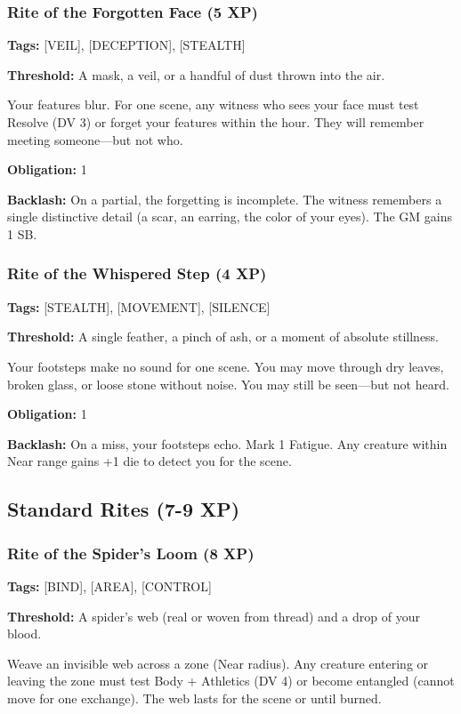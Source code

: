 \subsubsection{Rite of the Forgotten Face (5 XP)}

\textbf{Tags:} [VEIL], [DECEPTION], [STEALTH]

\textbf{Threshold:} A mask, a veil, or a handful of dust thrown into the air.

Your features blur. For one scene, any witness who sees your face must test Resolve (DV 3) or forget your features within the hour. They will remember meeting someone—but not who.

\textbf{Obligation:} 1

\textbf{Backlash:} On a partial, the forgetting is incomplete. The witness remembers a single distinctive detail (a scar, an earring, the color of your eyes). The GM gains 1 SB.

\subsubsection{Rite of the Whispered Step (4 XP)}

\textbf{Tags:} [STEALTH], [MOVEMENT], [SILENCE]

\textbf{Threshold:} A single feather, a pinch of ash, or a moment of absolute stillness.

Your footsteps make no sound for one scene. You may move through dry leaves, broken glass, or loose stone without noise. You may still be seen—but not heard.

\textbf{Obligation:} 1

\textbf{Backlash:} On a miss, your footsteps echo. Mark 1 Fatigue. Any creature within Near range gains +1 die to detect you for the scene.

\subsection{Standard Rites (7-9 XP)}

\subsubsection{Rite of the Spider's Loom (8 XP)}

\textbf{Tags:} [BIND], [AREA], [CONTROL]

\textbf{Threshold:} A spider's web (real or woven from thread) and a drop of your blood.

Weave an invisible web across a zone (Near radius). Any creature entering or leaving the zone must test Body + Athletics (DV 4) or become entangled (cannot move for one exchange). The web lasts for the scene or until burned.

